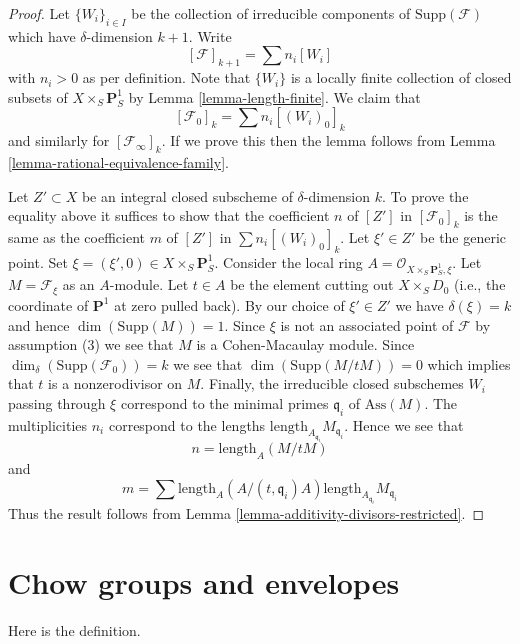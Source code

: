 \begin{proof}
Let $\{W_i\}_{i \in I}$ be the collection of irreducible
components of $\text{Supp}(\mathcal{F})$
which have $\delta$-dimension $k + 1$.
Write
$$
[\mathcal{F}]_{k + 1} = \sum n_i[W_i]
$$
with $n_i > 0$ as per definition. Note that $\{W_i\}$
is a locally finite collection of closed subsets of
$X \times_S \mathbf{P}^1_S$ by Lemma \ref{lemma-length-finite}.
We claim that
$$
[\mathcal{F}_0]_k = \sum n_i[(W_i)_0]_k
$$
and similarly for $[\mathcal{F}_\infty]_k$. If we prove this then the lemma
follows from Lemma \ref{lemma-rational-equivalence-family}.

\medskip\noindent
Let $Z' \subset X$ be an integral closed subscheme of $\delta$-dimension $k$.
To prove the equality above it suffices to show that the coefficient $n$
of $[Z']$ in $[\mathcal{F}_0]_k$ is the same as the coefficient $m$ of
$[Z']$ in $\sum n_i[(W_i)_0]_k$. Let $\xi' \in Z'$ be the generic point.
Set $\xi = (\xi', 0) \in  X \times_S \mathbf{P}^1_S$.
Consider the local ring $A = \mathcal{O}_{X \times_S \mathbf{P}^1_S, \xi}$.
Let $M = \mathcal{F}_\xi$ as an $A$-module.
Let $t \in A$ be the element cutting out $X \times_S D_0$
(i.e., the coordinate of $\mathbf{P}^1$ at zero pulled back).
By our choice of $\xi' \in Z'$ we have $\delta(\xi) = k$
and hence $\dim(\text{Supp}(M)) = 1$. Since $\xi$ is not an associated point
of $\mathcal{F}$ by assumption (3) we see that $M$ is a Cohen-Macaulay module.
Since $\dim_\delta(\text{Supp}(\mathcal{F}_0)) = k$
we see that $\dim(\text{Supp}(M/tM)) = 0$ which implies that $t$
is a nonzerodivisor on $M$. Finally, the irreducible closed subschemes
$W_i$ passing through $\xi$ correspond to the minimal primes
$\mathfrak q_i$ of $\text{Ass}(M)$. The multiplicities $n_i$ correspond
to the lengths $\text{length}_{A_{\mathfrak q_i}}M_{\mathfrak q_i}$.
Hence we see that
$$
n = \text{length}_A(M/tM)
$$
and
$$
m = \sum
\text{length}_A(A/(t, \mathfrak q_i)A)
\text{length}_{A_{\mathfrak q_i}}M_{\mathfrak q_i}
$$
Thus the result follows from
Lemma \ref{lemma-additivity-divisors-restricted}.
\end{proof}







\section{Chow groups and envelopes}
\label{section-envelopes}

\noindent
Here is the definition.

